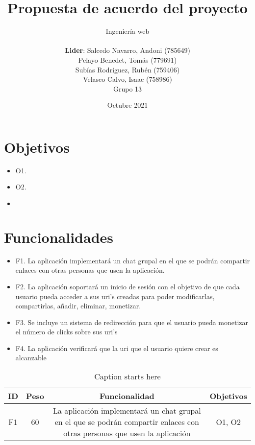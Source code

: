 \documentclass{article}
\title{Propuesta de acuerdo del proyecto}
\author{Ingeniería web\\\\\textbf{Lider}: Salcedo Navarro, Andoni (785649)\\Pelayo Benedet, Tomás (779691)\\Subías Rodríguez, Rubén (759406)\\Velasco Calvo, Isaac (758986)\\Grupo 13}
\date{Octubre 2021}
\begin{document}
 
\maketitle
 
\pagebreak
 
\section*{Objetivos}

\begin{itemize}
    \item O1.
    \item O2.
    \item 
\end{itemize}

\section*{Funcionalidades}

\begin{itemize}
    \item F1. La aplicación implementará un chat grupal en el que se podrán compartir enlaces con otras personas que usen la aplicación. 
    \item F2. La aplicación soportará un inicio de sesión con el objetivo de que cada usuario pueda acceder a sus uri's creadas para poder modificarlas, compartirlas, añadir, eliminar, monetizar.
    \item F3. Se incluye un sistema de redirección para que el usuario pueda monetizar el número de clicks sobre sus uri's
    \item F4. La aplicación verificará que la uri que el usuario quiere crear es alcanzable
\end{itemize}


\begin{table}[hbtp]
    \footnotesize
    \centering
    \settowidth{}
    \setlength\extrarowheight{2pt}
    \begin{tabulary}{\textwidth}{ C C C C}
        \textbf{ID} & 
        \textbf{Peso} & 
        \textbf{Funcionalidad} & 
        \textbf{Objetivos}\\
    \hline
        F1 & 
        60 & 
        La aplicación implementará un chat grupal en el que se podrán compartir enlaces con otras personas que usen la aplicación &
        O1, O2
    \\  

    \end{tabulary}
    \caption{Caption starts here}
    \label{XXX}
\end{table}

 
\end{document}
